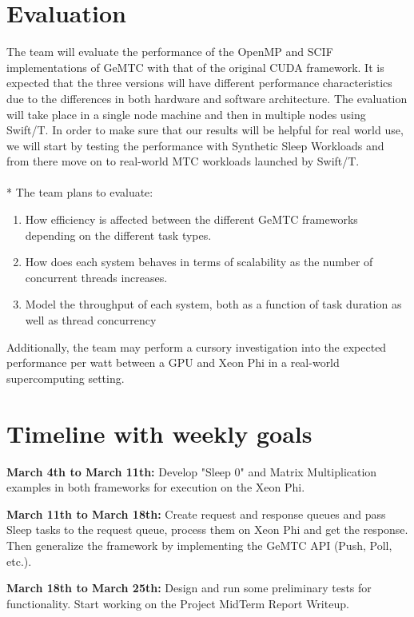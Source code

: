 \documentclass[10pt, conference, compsocconf]{IEEEtran}
\begin{document}
\section{Evaluation}
The team will evaluate the performance of the OpenMP and SCIF implementations of GeMTC with that of the original CUDA framework. It is expected that the three versions will have different performance characteristics due to the differences in both hardware and software architecture. The evaluation will take place in a single node machine and then in multiple nodes using Swift/T. In order to make sure that our results will be helpful for real world use, we will start by testing the performance with Synthetic Sleep Workloads and from there move on to real-world MTC workloads launched by Swift/T.\\
\\*
The team plans to evaluate:
\\
\begin{enumerate}
  \item How efficiency is affected between the different GeMTC frameworks depending on the different task types.
  \item How does each system behaves in terms of scalability as the number of concurrent threads increases.
  \item Model the throughput of each system, both as a function of task duration as well as thread concurrency
\end{enumerate}

Additionally, the team may perform a cursory investigation into the expected performance per watt between a GPU and Xeon Phi in a real-world supercomputing setting.

\section{Timeline with weekly goals}

\textbf{March 4th to March 11th:} Develop "Sleep 0" and Matrix Multiplication examples in both frameworks for execution on the Xeon Phi.

\textbf{March 11th to March 18th:} Create request and response queues and pass Sleep tasks to the request queue, process them on Xeon Phi and get the response. Then generalize the framework by implementing the GeMTC API (Push, Poll, etc.).

\textbf{March 18th to March 25th:} Design and run some preliminary tests for functionality. Start working on the Project MidTerm Report Writeup.
\end{document}
